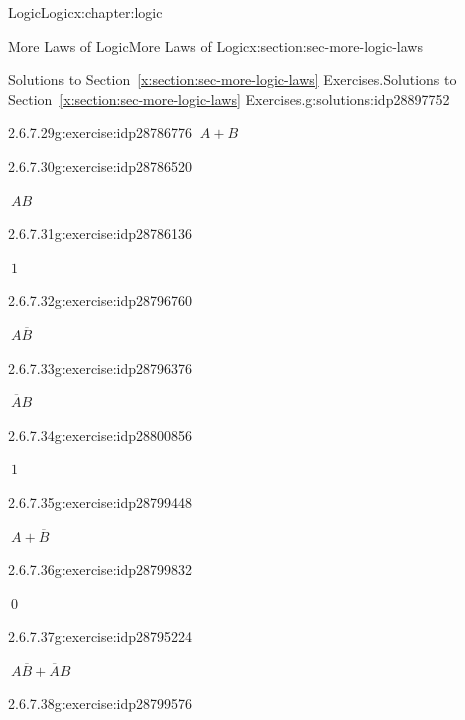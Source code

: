 \documentclass[twoside,10pt,]{book}
\newcommand{\xreffont}{\relax}
\numberwithin{equation}{section}
\begin{document}
\begin{chapterptx}{Logic}{}{Logic}{}{}{x:chapter:logic}
\begin{sectionptx}{More Laws of Logic}{}{More Laws of Logic}{}{}{x:section:sec-more-logic-laws}
\begin{solutions-subsection}{Solutions to Section~{\xreffont\ref*{x:section:sec-more-logic-laws}} Exercises.}{}{Solutions to Section~{\xreffont\ref*{x:section:sec-more-logic-laws}} Exercises.}{}{}{g:solutions:idp28897752}
\begin{exercisegroup}
\begin{divisionsolutioneg}{2.6.7.29}{}{g:exercise:idp28786776}
\noindent\hypertarget{g:solution:idp28788696-main}{}\(\ A+B\)\end{divisionsolutioneg}%
\begin{divisionsolutioneg}{2.6.7.30}{}{g:exercise:idp28786520}%
\par\smallskip%
\noindent\hypertarget{g:solution:idp28792408-main}{}\(\ AB\)\end{divisionsolutioneg}%
\begin{divisionsolutioneg}{2.6.7.31}{}{g:exercise:idp28786136}%
\par\smallskip%
\noindent\hypertarget{g:solution:idp28795480-main}{}\(\ 1\)\end{divisionsolutioneg}%
\begin{divisionsolutioneg}{2.6.7.32}{}{g:exercise:idp28796760}%
\par\smallskip%
\noindent\hypertarget{g:solution:idp28800728-main}{}\(\ A\overline{B}{}\)\end{divisionsolutioneg}%
\begin{divisionsolutioneg}{2.6.7.33}{}{g:exercise:idp28796376}%
\par\smallskip%
\noindent\hypertarget{g:solution:idp28798424-main}{}\(\ \overline{A}{}B\)\end{divisionsolutioneg}%
\begin{divisionsolutioneg}{2.6.7.34}{}{g:exercise:idp28800856}%
\par\smallskip%
\noindent\hypertarget{g:solution:idp28798040-main}{}\(\ 1\)\end{divisionsolutioneg}%
\begin{divisionsolutioneg}{2.6.7.35}{}{g:exercise:idp28799448}%
\par\smallskip%
\noindent\hypertarget{g:solution:idp28798936-main}{}\(\ A+\overline{B}{}\)\end{divisionsolutioneg}%
\begin{divisionsolutioneg}{2.6.7.36}{}{g:exercise:idp28799832}%
\par\smallskip%
\noindent\hypertarget{g:solution:idp28800088-main}{}\(\ 0\)\end{divisionsolutioneg}%
\begin{divisionsolutioneg}{2.6.7.37}{}{g:exercise:idp28795224}%
\par\smallskip%
\noindent\hypertarget{g:solution:idp28800216-main}{}\(\ A\overline{B}{}+\overline{A}{}B\)\end{divisionsolutioneg}%
\begin{divisionsolutioneg}{2.6.7.38}{}{g:exercise:idp28799576}%
\par\smallskip%

\end{divisionsolutioneg}
\end{exercisegroup}
\end{solutions-subsection}
\end{sectionptx}
\end{chapterptx}
\end{document}
